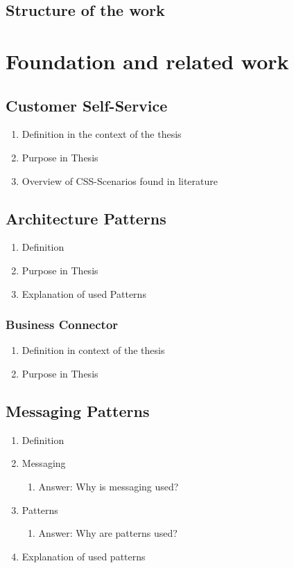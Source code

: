 \documentclass[
     12pt,         %
     a4paper,      %
     BCOR10mm,     %
     DIV14,        %
     ]{scrreprt}
\begin{document}
\section{Structure of the work}

\newpage

\chapter{Foundation and related work}

\section{Customer Self-Service}
\begin{enumerate}
     \item Definition in the context of the thesis
     \item Purpose in Thesis
     \item Overview of CSS-Scenarios found in literature
\end{enumerate}

\section{Architecture Patterns}
\begin{enumerate}
     \item Definition
     \item Purpose in Thesis
     \item Explanation of used Patterns
\end{enumerate}

\subsection{Business Connector}
\begin{enumerate}
     \item Definition in context of the thesis
     \item Purpose in Thesis
\end{enumerate}

\section{Messaging Patterns}
\begin{enumerate}
     \item Definition
     \item Messaging
           \begin{enumerate}
                \item Answer: Why is messaging used?
           \end{enumerate}
     \item Patterns
           \begin{enumerate}
                \item Answer: Why are patterns used?
           \end{enumerate}
     \item Explanation of used patterns
\end{enumerate}
\end{document}
